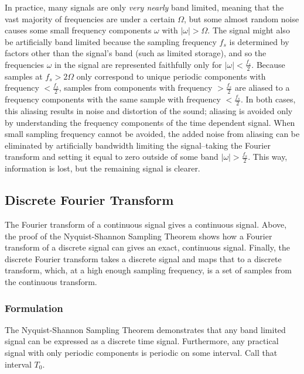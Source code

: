 \documentclass[12pt]{article}
\begin{document}
In practice, many signals are only \emph{very nearly} band limited, meaning that the vast majority of frequencies are under a certain \( \Omega \), but some almost random noise causes some small frequency components \( \omega \) with \( |\omega| > \Omega \). The signal might also be artificially band limited because the sampling frequency \( f_s\) is determined by factors other than the signal's band (such as limited storage), and so the frequencies \( \omega \) in the signal are represented faithfully only for \(|\omega| < \frac{f_s}{2} \). Because samples at \( f_s > 2\Omega \) only correspond to unique periodic components with frequency \( < \frac{f_s}{2} \), samples from components with frequency \( > \frac{f_s}{2} \) are aliased to a frequency components with the same sample with frequency \( < \frac{f_s}{2} \). In both cases, this aliasing results in noise and distortion of the sound; aliasing is avoided only by understanding the frequency components of the time dependent signal. When small sampling frequency cannot be avoided, the added noise from aliasing can be eliminated by artificially bandwidth limiting the signal--taking the Fourier transform and setting it equal to zero outside of some band \( |\omega| > \frac{f_s}{2}  \). This way, information is lost, but the remaining signal is clearer. 


\subsection{Discrete Fourier Transform}

The Fourier transform of a continuous signal gives a continuous signal. Above, the proof of the Nyquist-Shannon Sampling Theorem shows how a Fourier transform of a discrete signal can gives an exact, continuous signal. Finally, the discrete Fourier transform takes a discrete signal and maps that to a discrete transform, which, at a high enough sampling frequency, is a set of samples from the continuous transform.

\subsubsection{Formulation}

The Nyquist-Shannon Sampling Theorem demonstrates that any band limited signal can be expressed as a discrete time signal. Furthermore, any practical signal with only periodic components is periodic on some interval. Call that interval \( T_0\). 
\end{document}
